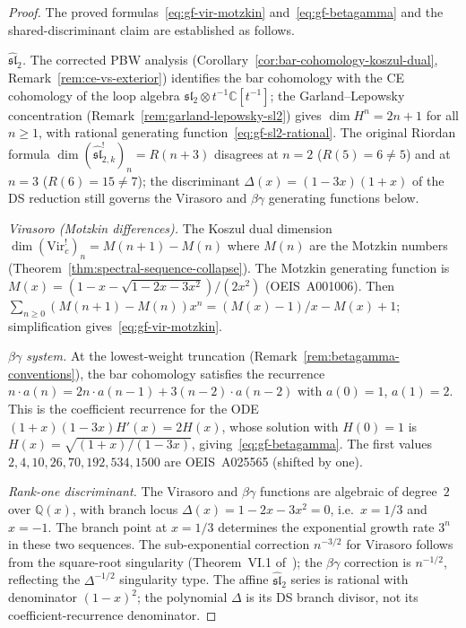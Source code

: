 \begin{proof}
The proved formulas~\eqref{eq:gf-vir-motzkin}
and~\eqref{eq:gf-betagamma} and the shared-discriminant
claim are established as follows.

\emph{$\widehat{\mathfrak{sl}}_2$.}
The corrected PBW analysis
(Corollary~\ref{cor:bar-cohomology-koszul-dual},
Remark~\ref{rem:ce-vs-exterior}) identifies the
bar cohomology with the CE cohomology of the loop algebra
$\mathfrak{sl}_2 \otimes t^{-1}\mathbb{C}[t^{-1}]$;
the Garland--Lepowsky concentration
(Remark~\ref{rem:garland-lepowsky-sl2}) gives
$\dim H^n = 2n+1$ for all $n \geq 1$, with rational
generating function~\eqref{eq:gf-sl2-rational}.
The original Riordan formula
$\dim (\widehat{\mathfrak{sl}}_{2,k}^!)_n = R(n+3)$
disagrees at $n = 2$ ($R(5) = 6 \neq 5$)
and at $n = 3$ ($R(6) = 15 \neq 7$);
the discriminant $\Delta(x) = (1-3x)(1+x)$
of the DS reduction still governs the Virasoro and
$\beta\gamma$ generating functions below.

\emph{Virasoro (Motzkin differences).}
The Koszul dual dimension $\dim (\mathrm{Vir}_c^!)_n
= M(n{+}1) - M(n)$ where $M(n)$ are the Motzkin numbers
(Theorem~\ref{thm:spectral-sequence-collapse}). The Motzkin
generating function is $M(x) = (1 - x - \sqrt{1-2x-3x^2})/(2x^2)$
(OEIS~A001006). Then
$\sum_{n \geq 0}(M(n{+}1) - M(n))x^n = (M(x) - 1)/x - M(x) + 1$;
simplification gives~\eqref{eq:gf-vir-motzkin}.

\emph{$\beta\gamma$ system.}
At the lowest-weight truncation
(Remark~\ref{rem:betagamma-conventions}), the bar cohomology
satisfies the recurrence
$n \cdot a(n) = 2n \cdot a(n{-}1) + 3(n{-}2) \cdot a(n{-}2)$
with $a(0) = 1$, $a(1) = 2$. This is the coefficient recurrence
for the ODE $(1{+}x)(1{-}3x)H'(x) = 2H(x)$, whose solution with
$H(0) = 1$ is $H(x) = \sqrt{(1{+}x)/(1{-}3x)}$,
giving~\eqref{eq:gf-betagamma}.
The first values $2, 4, 10, 26, 70, 192, 534, 1500$
are OEIS~A025565 (shifted by one).

\emph{Rank-one discriminant.}
The Virasoro and $\beta\gamma$ functions are algebraic of degree~$2$
over $\mathbb{Q}(x)$, with branch locus
$\Delta(x) = 1 - 2x - 3x^2 = 0$, i.e.\ $x = 1/3$ and $x = -1$.
The branch point at $x = 1/3$ determines the exponential growth rate
$3^n$ in these two sequences.  The sub-exponential correction
$n^{-3/2}$ for Virasoro follows from the square-root singularity
(Theorem~VI.1 of~\cite{FlajoletSedgewick}); the $\beta\gamma$
correction is $n^{-1/2}$, reflecting the $\Delta^{-1/2}$ singularity
type.  The affine $\widehat{\mathfrak{sl}}_2$ series is rational with
denominator $(1-x)^2$; the polynomial $\Delta$ is its DS branch divisor,
not its coefficient-recurrence denominator.


\end{proof}
